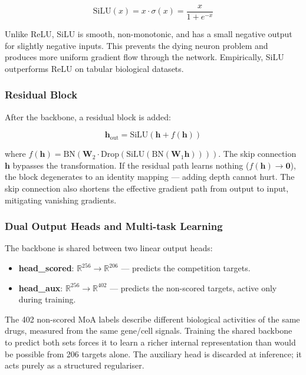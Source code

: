 \documentclass[12pt, a4paper]{article}
\begin{document}
\begin{equation}
\text{SiLU}(x) = x \cdot \sigma(x) = \frac{x}{1 + e^{-x}}
\end{equation}

Unlike ReLU, SiLU is smooth, non-monotonic, and has a small negative output for slightly negative inputs. This prevents the dying neuron problem and produces more uniform gradient flow through the network. Empirically, SiLU outperforms ReLU on tabular biological datasets.

\subsubsection{Residual Block}

After the backbone, a residual block \cite{he2016deep} is added:

\begin{equation}
\mathbf{h}_{\text{out}} = \text{SiLU}\!\left(\mathbf{h} + f(\mathbf{h})\right)
\end{equation}

where $f(\mathbf{h}) = \text{BN}(\mathbf{W}_2 \cdot \text{Drop}(\text{SiLU}(\text{BN}(\mathbf{W}_1 \mathbf{h}))))$. The skip connection $\mathbf{h}$ bypasses the transformation. If the residual path learns nothing ($f(\mathbf{h}) \to \mathbf{0}$), the block degenerates to an identity mapping — adding depth cannot hurt. The skip connection also shortens the effective gradient path from output to input, mitigating vanishing gradients.

\subsubsection{Dual Output Heads and Multi-task Learning}

The backbone is shared between two linear output heads:
\begin{itemize}[noitemsep]
    \item \textbf{head\_scored}: $\mathbb{R}^{256} \to \mathbb{R}^{206}$ — predicts the competition targets.
    \item \textbf{head\_aux}: $\mathbb{R}^{256} \to \mathbb{R}^{402}$ — predicts the non-scored targets, active only during training.
\end{itemize}

The 402 non-scored MoA labels describe different biological activities of the same drugs, measured from the same gene/cell signals. Training the shared backbone to predict both sets forces it to learn a richer internal representation than would be possible from 206 targets alone. The auxiliary head is discarded at inference; it acts purely as a structured regulariser.
\end{document}

